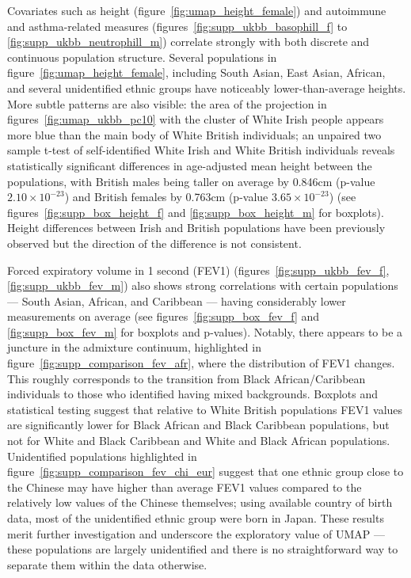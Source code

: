 \documentclass[12pt]{pnas-new}
\begin{document}
Covariates such as height (figure~\ref{fig:umap_height_female}) and autoimmune and asthma-related measures  (figures~\ref{fig:supp_ukbb_basophill_f} to \ref{fig:supp_ukbb_neutrophill_m}) correlate strongly with both discrete and continuous population structure. Several populations in figure~\ref{fig:umap_height_female}, including South Asian, East Asian, African, and several unidentified ethnic groups have noticeably lower-than-average heights. More subtle patterns are also visible: the area of the projection in figures~\ref{fig:umap_ukbb_pc10} with the cluster of White Irish people appears more blue than the main body of White British individuals; an unpaired two sample t-test of self-identified White Irish and White British individuals reveals statistically significant differences in age-adjusted mean height between the populations, with British males being taller on average by 0.846cm (p-value $2.10\times 10^{-23}$) and British females by 0.763cm (p-value $3.65\times 10^{-23}$) (see figures~\ref{fig:supp_box_height_f} and \ref{fig:supp_box_height_m} for boxplots). Height differences between Irish and British populations have been previously observed but the direction of the difference is not consistent\cite{robinson2015population,komlos1994stature}.

Forced expiratory volume in 1 second (FEV1) (figures~\ref{fig:supp_ukbb_fev_f}, \ref{fig:supp_ukbb_fev_m}) also shows strong correlations with certain populations --- South Asian, African, and Caribbean --- having considerably lower measurements on average (see figures~\ref{fig:supp_box_fev_f} and \ref{fig:supp_box_fev_m} for boxplots and p-values). Notably, there appears to be a juncture in the admixture continuum, highlighted in figure~\ref{fig:supp_comparison_fev_afr}, where the distribution of FEV1 changes. This roughly corresponds to the transition from Black African/Caribbean individuals to those who identified having mixed backgrounds. Boxplots and statistical testing suggest that relative to White British populations FEV1 values are significantly lower for Black African and Black Caribbean populations, but not for White and Black Caribbean and White and Black African populations. Unidentified populations highlighted in figure~\ref{fig:supp_comparison_fev_chi_eur} suggest that one ethnic group close to the Chinese may have higher than average FEV1 values compared to the relatively low values of the Chinese themselves; using available country of birth data, most of the unidentified ethnic group were born in Japan. These results merit further investigation and underscore the exploratory value of UMAP --- these  populations are largely unidentified and there is no straightforward way to separate them within the data otherwise.
\end{document}
